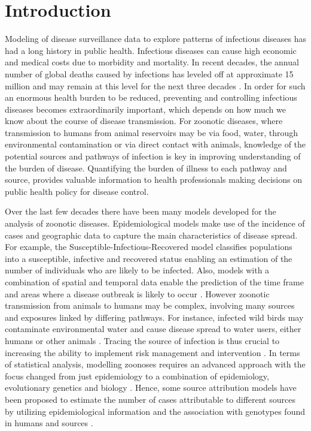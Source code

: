 \documentclass[times, doublespace]{WileyNJD-v2}%
\begin{document}
\section{Introduction}
Modeling of disease surveillance data to explore patterns of infectious diseases has had a long history in public health. Infectious diseases can cause high economic and medical costs due to morbidity and mortality. In recent decades, the annual number of global deaths caused by infections has leveled off at approximate 15 million and may remain at this level for the next three decades \cite{DyeC, WHOM}. In order for such an enormous health burden to be reduced, preventing and controlling infectious diseases becomes extraordinarily important, which depends on how much we know about the course of disease transmission. For zoonotic diseases, where transmission to humans from animal reservoirs may be via food, water, through environmental contamination or via direct contact with animals, knowledge of the potential sources and pathways of infection is key in improving understanding of the burden of disease. Quantifying the burden of illness to each pathway and source, provides valuable information to health professionals making decisions on public health policy for disease control. 

Over the last few decades there have been many models developed for the analysis of zoonotic diseases. Epidemiological models make use of the incidence of cases and geographic data to capture the main characteristics of disease spread. For example, the Susceptible-Infectious-Recovered model \cite{Kerm} classifies populations into a susceptible, infective and recovered status enabling an estimation of the number of individuals who are likely to be infected. Also, models with a combination of spatial and temporal data enable the prediction of the time frame and areas where a disease outbreak is likely to occur \cite{HeldL, Hoehl, Simo}. However zoonotic transmission from animals to humans may be complex, involving many sources and exposures linked by differing pathways. For instance, infected wild birds may contaminate environmental water and cause disease spread to water users, either humans or other animals \cite{Wagen}. Tracing the source of infection is thus crucial to increasing the ability to implement risk management and intervention \cite{Wilso, Morel}. In terms of statistical analysis, modelling zoonoses requires an advanced approach with the focus changed from just epidemiology to a combination of epidemiology, evolutionary genetics and biology \cite{Muell}. Hence, some source attribution models have been proposed to estimate the number of cases attributable to different sources by utilizing epidemiological information and the association with genotypes found in humans and sources \cite{vanP, Hald, MullA}. 
\end{document}
